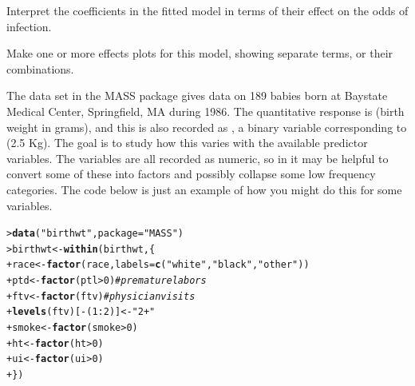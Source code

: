 \documentclass[10pt]{report}\usepackage[]{graphicx}\usepackage[]{color}
\makeatletter
\newcommand{\hlnum}[1]{\textcolor[rgb]{0.686,0.059,0.569}{#1}}%
\newcommand{\hlstr}[1]{\textcolor[rgb]{0.192,0.494,0.8}{#1}}%
\newcommand{\hlcom}[1]{\textcolor[rgb]{0.678,0.584,0.686}{\textit{#1}}}%
\newcommand{\hlopt}[1]{\textcolor[rgb]{0,0,0}{#1}}%
\newcommand{\hlstd}[1]{\textcolor[rgb]{0.345,0.345,0.345}{#1}}%
\newcommand{\hlkwb}[1]{\textcolor[rgb]{0.69,0.353,0.396}{#1}}%
\newcommand{\hlkwc}[1]{\textcolor[rgb]{0.333,0.667,0.333}{#1}}%
\newcommand{\hlkwd}[1]{\textcolor[rgb]{0.737,0.353,0.396}{\textbf{#1}}}%
\newenvironment{kframe}{%
 \def\at@end@of@kframe{}%
 \ifinner\ifhmode%
  \def\at@end@of@kframe{\end{minipage}}%
  \begin{minipage}{\columnwidth}%
 \fi\fi%
 \def\FrameCommand##1{\hskip\@totalleftmargin \hskip-\fboxsep
 \colorbox{shadecolor}{##1}\hskip-\fboxsep
     \hskip-\linewidth \hskip-\@totalleftmargin \hskip\columnwidth}%
 \MakeFramed {\advance\hsize-\width
   \@totalleftmargin\z@ \linewidth\hsize
   \@setminipage}}%
 {\par\unskip\endMakeFramed%
 \at@end@of@kframe}
\newenvironment{knitrout}{}{} %
\renewenvironment{knitrout}{\small\renewcommand{\baselinestretch}{.85}}{} %
\makeatother
\begin{document}
\begin{Exercises}
\begin{enumerate*}
    \item Interpret the coefficients in the fitted model in terms of their effect on the odds
    of infection. 
    \begin{ans}
    \end{ans}
    
    \item Make one or more effects plots for this model, showing separate terms, or their
    combinations.
    \begin{ans}
    \end{ans}
    
  \end{enumerate*}

\exercise The data set  in the MASS package gives data on 189 babies born at Baystate Medical Center, Springfield, MA during 1986. The quantitative response is  (birth weight in grams), and this is also recorded as , a binary variable corresponding to 
 (2.5 Kg).  The goal is to study how this varies with the available predictor variables.  
The variables are all recorded as numeric, so in \R it may be helpful to convert some of these into factors and possibly collapse some low frequency categories.  The code below is just an example of how you might do this for some variables.
\begin{knitrout}\footnotesize
{}\color{fgcolor}\begin{kframe}
\begin{alltt}
\hlstd{> }\hlkwd{data}\hlstd{(}\hlstr{"birthwt"}\hlstd{,} \hlkwc{package}\hlstd{=}\hlstr{"MASS"}\hlstd{)}
\hlstd{> }\hlstd{birthwt} \hlkwb{<-} \hlkwd{within}\hlstd{(birthwt, \{}
\hlstd{+ }  \hlstd{race} \hlkwb{<-} \hlkwd{factor}\hlstd{(race,} \hlkwc{labels} \hlstd{=} \hlkwd{c}\hlstd{(}\hlstr{"white"}\hlstd{,} \hlstr{"black"}\hlstd{,} \hlstr{"other"}\hlstd{))}
\hlstd{+ }        \hlstd{ptd} \hlkwb{<-} \hlkwd{factor}\hlstd{(ptl} \hlopt{>} \hlnum{0}\hlstd{)}  \hlcom{# premature labors}
\hlstd{+ }        \hlstd{ftv} \hlkwb{<-} \hlkwd{factor}\hlstd{(ftv)}      \hlcom{# physician visits}
\hlstd{+ }        \hlkwd{levels}\hlstd{(ftv)[}\hlopt{-}\hlstd{(}\hlnum{1}\hlopt{:}\hlnum{2}\hlstd{)]} \hlkwb{<-} \hlstr{"2+"}
\hlstd{+ }        \hlstd{smoke} \hlkwb{<-} \hlkwd{factor}\hlstd{(smoke}\hlopt{>}\hlnum{0}\hlstd{)}
\hlstd{+ }        \hlstd{ht} \hlkwb{<-} \hlkwd{factor}\hlstd{(ht}\hlopt{>}\hlnum{0}\hlstd{)}
\hlstd{+ }        \hlstd{ui} \hlkwb{<-} \hlkwd{factor}\hlstd{(ui}\hlopt{>}\hlnum{0}\hlstd{)}
\hlstd{+ }  \hlstd{\})}
\end{alltt}
\end{kframe}
\end{knitrout}


\end{Exercises}
\end{document}
